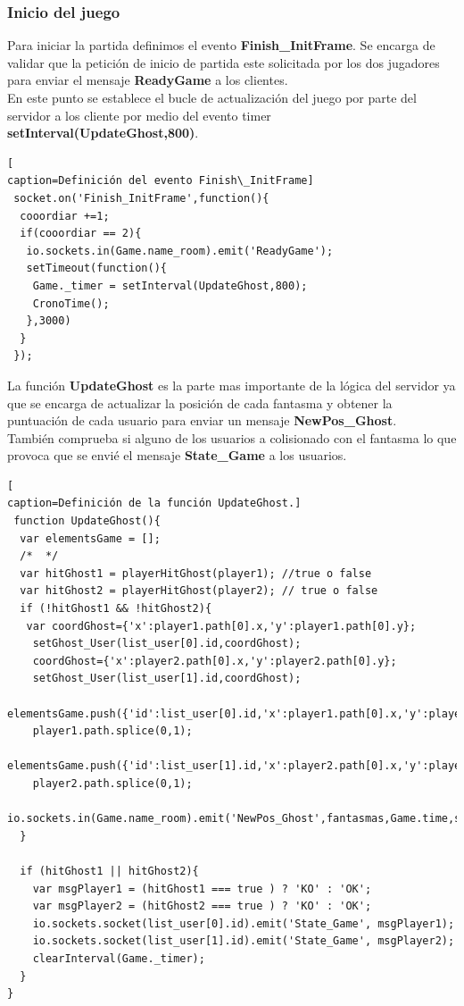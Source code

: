 \subsubsection{Inicio del juego}
Para iniciar la partida definimos el evento \textbf{Finish\_InitFrame}. Se encarga de validar que la petición de inicio de partida este solicitada por los dos jugadores para enviar el mensaje \textbf{ReadyGame} a los clientes.
\\En este punto se establece el bucle de actualización del juego por parte del servidor a los cliente por medio del evento timer \textbf{setInterval(UpdateGhost,800)}.
\begin{lstlisting}[
caption=Definición del evento Finish\_InitFrame]
 socket.on('Finish_InitFrame',function(){
  cooordiar +=1;
  if(cooordiar == 2){
   io.sockets.in(Game.name_room).emit('ReadyGame');
   setTimeout(function(){
    Game._timer = setInterval(UpdateGhost,800);
    CronoTime();
   },3000)
  }
 });
\end{lstlisting}
La función \textbf{UpdateGhost} es la parte mas importante de la lógica del servidor ya que se encarga de actualizar la posición de cada fantasma y obtener la puntuación de cada usuario para enviar un mensaje \textbf{NewPos\_Ghost}.
\\También comprueba si alguno de los usuarios a colisionado con el fantasma lo que provoca que se envié el mensaje \textbf{State\_Game} a los usuarios.
\begin{lstlisting}[
caption=Definición de la función UpdateGhost.]
 function UpdateGhost(){
  var elementsGame = [];
  /*  */
  var hitGhost1 = playerHitGhost(player1); //true o false
  var hitGhost2 = playerHitGhost(player2); // true o false
  if (!hitGhost1 && !hitGhost2){
   var coordGhost={'x':player1.path[0].x,'y':player1.path[0].y};
  	setGhost_User(list_user[0].id,coordGhost);
  	coordGhost={'x':player2.path[0].x,'y':player2.path[0].y};
  	setGhost_User(list_user[1].id,coordGhost);
  	elementsGame.push({'id':list_user[0].id,'x':player1.path[0].x,'y':player1.path[0].y,'score':list_user[0].score});
  	player1.path.splice(0,1);
  	elementsGame.push({'id':list_user[1].id,'x':player2.path[0].x,'y':player2.path[0].y,'score':list_user[1].score}});
  	player2.path.splice(0,1);
  	io.sockets.in(Game.name_room).emit('NewPos_Ghost',fantasmas,Game.time,scores);
  }

  if (hitGhost1 || hitGhost2){
  	var msgPlayer1 = (hitGhost1 === true ) ? 'KO' : 'OK';
  	var msgPlayer2 = (hitGhost2 === true ) ? 'KO' : 'OK';
  	io.sockets.socket(list_user[0].id).emit('State_Game', msgPlayer1);
  	io.sockets.socket(list_user[1].id).emit('State_Game', msgPlayer2);
  	clearInterval(Game._timer);
  }  
}
\end{lstlisting}
